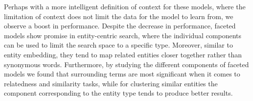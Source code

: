 Perhaps with a more intelligent definition of context for these models, where the limitation of context does not limit the data for the model to learn from, we observe a boost in performance.
Despite the decrease in performance, faceted models show promise in entity-centric search, where the individual components can be used to limit the search space to a specific type. Moreover, similar to entity embedding, they tend to map related entities closer together rather than synonymous words. Furthermore, by studying the different components of faceted models we found that surrounding terms are most significant when it comes to relatedness and similarity tasks, while for clustering similar entities the component corresponding to the entity type tends to produce better results.

